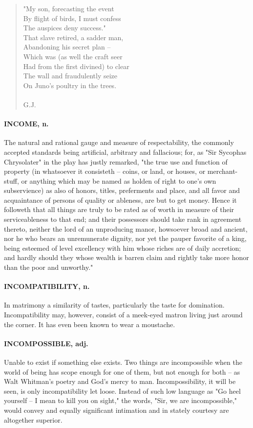 \documentclass[11pt]{article}
\begin{document}
\begin{quote}
  "My son, forecasting the event \\
  By flight of birds, I must confess \\
  The auspices deny success." \\
  That slave retired, a sadder man, \\
  Abandoning his secret plan -- \\
  Which was (as well the craft seer \\
  Had from the first divined) to clear \\
  The wall and fraudulently seize \\
  On Juno's poultry in the trees. \\
 \\
G.J. \end{quote}


\paragraph{INCOME, n.}  The natural and rational gauge and measure of
respectability, the commonly accepted standards being artificial,
arbitrary and fallacious; for, as "Sir Sycophas Chrysolater" in the
play has justly remarked, "the true use and function of property (in
whatsoever it consisteth -- coins, or land, or houses, or merchant-
stuff, or anything which may be named as holden of right to one's own
subservience) as also of honors, titles, preferments and place, and
all favor and acquaintance of persons of quality or ableness, are but
to get money.  Hence it followeth that all things are truly to be
rated as of worth in measure of their serviceableness to that end; and
their possessors should take rank in agreement thereto, neither the
lord of an unproducing manor, howsoever broad and ancient, nor he who
bears an unremunerate dignity, nor yet the pauper favorite of a king,
being esteemed of level excellency with him whose riches are of daily
accretion; and hardly should they whose wealth is barren claim and
rightly take more honor than the poor and unworthy."

\paragraph{INCOMPATIBILITY, n.}  In matrimony a similarity of tastes, particularly
the taste for domination.  Incompatibility may, however, consist of a
meek-eyed matron living just around the corner.  It has even been
known to wear a moustache.

\paragraph{INCOMPOSSIBLE, adj.}  Unable to exist if something else exists.  Two
things are incompossible when the world of being has scope enough for
one of them, but not enough for both -- as Walt Whitman's poetry and
God's mercy to man.  Incompossibility, it will be seen, is only
incompatibility let loose.  Instead of such low language as "Go heel
yourself -- I mean to kill you on sight," the words, "Sir, we are
incompossible," would convey and equally significant intimation and in
stately courtesy are altogether superior.
\end{document}
